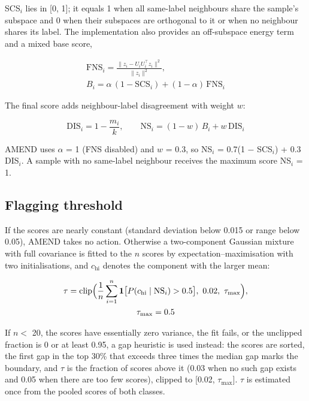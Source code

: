 \documentclass[conference]{IEEEtran}
\begin{document}
SCS$_{i}$ lies in {[}0, 1{]}; it equals 1 when all same-label neighbours share the sample's subspace and 0 when their subspaces are orthogonal to it or when no neighbour shares its label. The implementation also provides an off-subspace energy term and a mixed base score,

\begin{equation}
\begin{gathered}
\mathrm{FNS}_i=\frac{\|z_i-U_iU_i^{\top}z_i\|^{2}}{\|z_i\|^{2}},\\
B_i=\alpha\,(1-\mathrm{SCS}_i)+(1-\alpha)\,\mathrm{FNS}_i
\end{gathered}
\label{eq:6}
\end{equation}

The final score adds neighbour-label disagreement with weight $w$:

\begin{equation}
\mathrm{DIS}_i=1-\frac{m_i}{k},\qquad \mathrm{NS}_i=(1-w)\,B_i+w\,\mathrm{DIS}_i
\label{eq:7}
\end{equation}

AMEND uses $\alpha $ = 1 (FNS disabled) and $w$ = 0.3, so NS$_{i}$ = 0.7(1 $-$ SCS$_{i}$) + 0.3 DIS$_{i}$. A sample with no same-label neighbour receives the maximum score NS$_{i}$ = 1.

\subsection{Flagging threshold}\label{sec:flagging-threshold}

If the scores are nearly constant (standard deviation below 0.015 or range below 0.05), AMEND takes no action. Otherwise a two-component Gaussian mixture with full covariance is fitted to the $n$ scores by expectation--maximisation \cite{dempster1977} with two initialisations, and $c_{\mathrm{hi}}$ denotes the component with the larger mean:

\begin{equation}
\begin{gathered}
\tau=\operatorname{clip}\Bigl(\frac{1}{n}\sum_{i=1}^{n}\mathbf{1}\bigl[P(c_{\mathrm{hi}}\mid\mathrm{NS}_i)>0.5\bigr],\ 0.02,\ \tau_{\max}\Bigr),\\
\tau_{\max}=0.5
\end{gathered}
\label{eq:8}
\end{equation}

If $n <$ 20, the scores have essentially zero variance, the fit fails, or the unclipped fraction is 0 or at least 0.95, a gap heuristic is used instead: the scores are sorted, the first gap in the top 30\% that exceeds three times the median gap marks the boundary, and $\tau $ is the fraction of scores above it (0.03 when no such gap exists and 0.05 when there are too few scores), clipped to {[}0.02, $\tau _{\mathrm{max}}${]}. $\tau $ is estimated once from the pooled scores of both classes.
\end{document}

